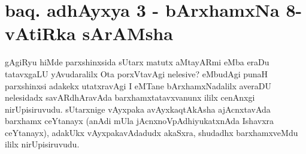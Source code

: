 
\section*{baq. adhAyxya 3 - bArxhamxNa 8-vAtiRka sArAMsha}

\begin{artha}%
gAgiRyu hiMde parxshinxsida sUtarx matutx aMtayARmi eMba eraDu tatavxgaLU yAvudaralilx Ota porxVtavAgi nelesive? eMbudAgi punaH parxshinxsi adakekx utatxravAgi I eMTane bArxhamxNadalilx averaDU nelesidadx savARdhAravAda barxhamxtatavxvanunx ililx cenAnxgi nirUpisiruvudu. sUtarxnige vAyxpaka avAyxkaqtAkAsha ajAcnxtavAda barxhamx ceYtanayx (anAdi mUla jAcnxnoVpAdhiyukatxnAda Ishavxra ceYtanayx), adakUkx vAyxpakavAdadudx akaSxra, shudadhx barxhamxveMdu ililx nirUpisiruvudu.
\end{artha}

